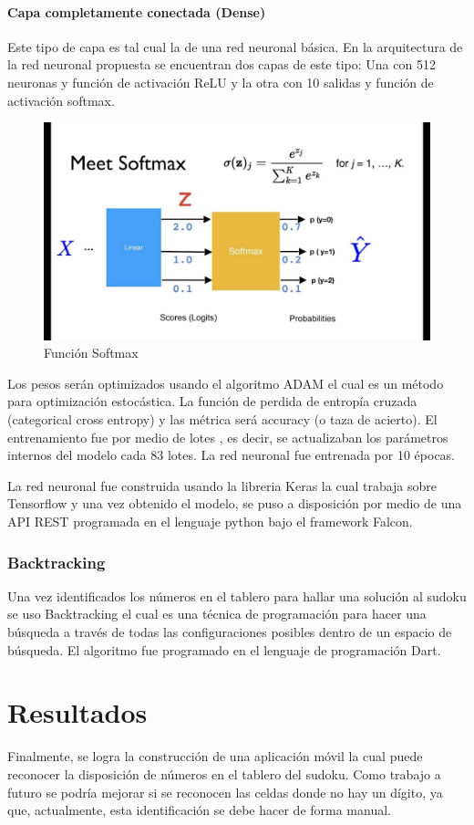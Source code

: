 \documentclass{article}
\begin{document}
\paragraph{Capa completamente conectada (Dense)} Este tipo de capa es tal cual la de una red neuronal b\'asica. En la arquitectura de la red neuronal propuesta se encuentran dos capas de este tipo: Una con 512 neuronas y funci\'on de activaci\'on ReLU y la otra con 10 salidas y funci\'on de activaci\'on softmax.
\begin{figure}[H]
  \caption{Funci\'on Softmax}
  \centering 
  \includegraphics[scale=.30]{softmax}
\end{figure}

Los pesos ser\'an optimizados usando el algoritmo ADAM el cual es un m\'etodo para optimizaci\'on estoc\'astica. La funci\'on de perdida de entrop\'ia cruzada (categorical cross entropy) y las m\'etrica ser\'a accuracy (o taza de acierto).
El entrenamiento fue por medio de lotes , es decir, se actualizaban los par\'ametros internos del modelo cada 83 lotes. La red neuronal fue entrenada por 10 \'epocas.

La red neuronal fue construida usando la libreria Keras la cual trabaja sobre Tensorflow y una vez obtenido el modelo, se puso a disposici\'on por medio de una API REST programada en el lenguaje python bajo el framework Falcon.
\subsubsection{Backtracking}
Una vez identificados los n\'umeros en el tablero para hallar una soluci\'on al sudoku se uso Backtracking el cual es una t\'ecnica de programaci\'on para hacer una b\'usqueda a trav\'es de todas las configuraciones posibles dentro de un espacio de b\'usqueda.
El algoritmo fue programado en el lenguaje de programaci\'on Dart.
\section{Resultados}
Finalmente, se logra la construcci\'on de una aplicaci\'on m\'ovil la cual puede reconocer la disposici\'on de n\'umeros en el tablero del sudoku.
Como trabajo a futuro se podr\'ia mejorar  si se reconocen las celdas donde no hay un d\'igito, ya que, actualmente, esta identificaci\'on se debe hacer de forma manual.


    
\end{document}
